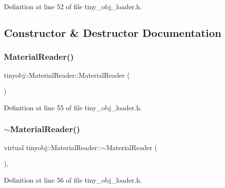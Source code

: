 Definition at line 52 of file tiny\+\_\+obj\+\_\+loader.\+h.



\subsection{Constructor \& Destructor Documentation}
\mbox{\label{classtinyobj_1_1_material_reader_a701bdd6217518e0afb5596fcb59925b6}} 
\subsubsection{\texorpdfstring{Material\+Reader()}{MaterialReader()}}
{\footnotesize\ttfamily tinyobj\+::\+Material\+Reader\+::\+Material\+Reader (\begin{DoxyParamCaption}{ }\end{DoxyParamCaption})\hspace{0.3cm}{\ttfamily [inline]}}



Definition at line 55 of file tiny\+\_\+obj\+\_\+loader.\+h.

\mbox{\label{classtinyobj_1_1_material_reader_afd62ceccd9b373801226e037ea1a5f9f}} 
\subsubsection{\texorpdfstring{$\sim$\+Material\+Reader()}{~MaterialReader()}}
{\footnotesize\ttfamily virtual tinyobj\+::\+Material\+Reader\+::$\sim$\+Material\+Reader (\begin{DoxyParamCaption}{ }\end{DoxyParamCaption})\hspace{0.3cm}{\ttfamily [inline]}, {\ttfamily [virtual]}}



Definition at line 56 of file tiny\+\_\+obj\+\_\+loader.\+h.



